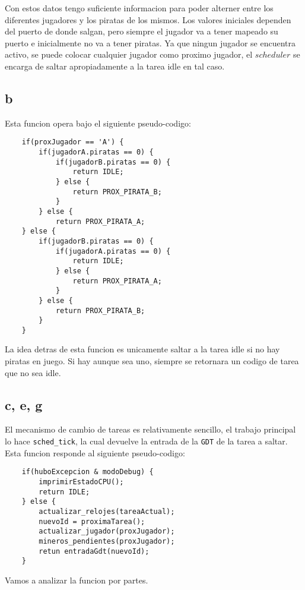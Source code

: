Con estos datos tengo suficiente informacion para poder alterner entre los diferentes jugadores y los piratas de los mismos. Los valores iniciales dependen del puerto de donde salgan, pero siempre el jugador va a tener mapeado su puerto e inicialmente no va a tener piratas. Ya que ningun jugador se encuentra activo, se puede colocar cualquier jugador como proximo jugador, el $scheduler$ se encarga de saltar apropiadamente a la tarea idle en tal caso.

\subsection{b}

Esta funcion opera bajo el siguiente pseudo-codigo:\\

\begin{lstlisting}
	if(proxJugador == 'A') {
		if(jugadorA.piratas == 0) {
			if(jugadorB.piratas == 0) {
				return IDLE;
			} else {
				return PROX_PIRATA_B;
			}
		} else {
			return PROX_PIRATA_A;
	} else {
		if(jugadorB.piratas == 0) {
			if(jugadorA.piratas == 0) {
				return IDLE;
			} else {
				return PROX_PIRATA_A;
			}
		} else {
			return PROX_PIRATA_B;
		}
	}
\end{lstlisting}

La idea detras de esta funcion es unicamente saltar a la tarea idle si no hay piratas en juego. Si hay aunque sea uno, siempre se retornara un codigo de tarea que no sea idle.

\subsection{c, e, g}

El mecanismo de cambio de tareas es relativamente sencillo, el trabajo principal lo hace \texttt{sched\_tick}, la cual devuelve la entrada de la \texttt{GDT} de la tarea a saltar. Esta funcion responde al siguiente pseudo-codigo:

\begin{lstlisting}
	if(huboExcepcion & modoDebug) {
		imprimirEstadoCPU();
		return IDLE;
	} else {
		actualizar_relojes(tareaActual);
		nuevoId = proximaTarea();
		actualizar_jugador(proxJugador);
		mineros_pendientes(proxJugador);
		retun entradaGdt(nuevoId);
	}
\end{lstlisting}

Vamos a analizar la funcion por partes.

